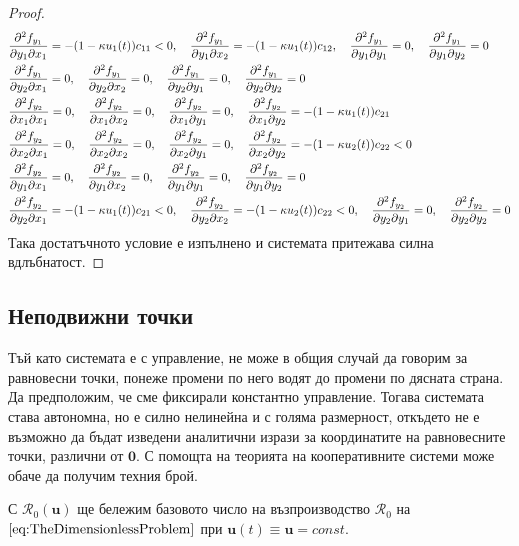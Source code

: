 \begin{proof}
{\begin{align*}
    &\pdv{f_{y_1}}{y_1}{x_1} = -(1-\kappa u_1(t))c_{11} < 0, \quad
    \pdv{f_{y_1}}{y_1}{x_2} = -(1-\kappa u_1(t))c_{12}, \quad
    \pdv{f_{y_1}}{y_1}{y_1} = 0, \quad
    \pdv{f_{y_1}}{y_1}{y_2} = 0 \\
    &\pdv{f_{y_1}}{y_2}{x_1} = 0, \quad
    \pdv{f_{y_1}}{y_2}{x_2} = 0, \quad
    \pdv{f_{y_1}}{y_2}{y_1} = 0, \quad
    \pdv{f_{y_1}}{y_2}{y_2} = 0 \\
    &\pdv{f_{y_2}}{x_1}{x_1} = 0, \quad
    \pdv{f_{y_2}}{x_1}{x_2} = 0, \quad
    \pdv{f_{y_2}}{x_1}{y_1} = 0, \quad
    \pdv{f_{y_2}}{x_1}{y_2} = -(1-\kappa u_1(t)) c_{21} \\
    &\pdv{f_{y_2}}{x_2}{x_1} = 0, \quad
    \pdv{f_{y_2}}{x_2}{x_2} = 0, \quad
    \pdv{f_{y_2}}{x_2}{y_1} = 0, \quad
    \pdv{f_{y_2}}{x_2}{y_2} = -(1-\kappa u_2(t)) c_{22} < 0 \\
    &\pdv{f_{y_2}}{y_1}{x_1} = 0, \quad
    \pdv{f_{y_2}}{y_1}{x_2} = 0, \quad
    \pdv{f_{y_2}}{y_1}{y_1} = 0, \quad
    \pdv{f_{y_2}}{y_1}{y_2} = 0 \\
    &\pdv{f_{y_2}}{y_2}{x_1} = -(1-\kappa u_1(t)) c_{21} < 0, \quad
    \pdv{f_{y_2}}{y_2}{x_2} = -(1-\kappa u_2(t)) c_{22} < 0, \quad
    \pdv{f_{y_2}}{y_2}{y_1} = 0, \quad
    \pdv{f_{y_2}}{y_2}{y_2} = 0
  \end{align*}
}
Така достатъчното условие е изпълнено и системата притежава силна вдлъбнатост.
\end{proof}


\subsection{Неподвижни точки}

Тъй като системата е с управление, не може в общия случай да говорим за равновесни точки, понеже промени по него водят до промени по дясната страна.
Да предположим, че сме фиксирали константно управление.
Тогава системата става автономна, но е силно нелинейна и с голяма размерност, откъдето не е възможно да бъдат изведени аналитични изрази за координатите на равновесните точки, различни от $\mathbf{0}$.
С помощта на теорията на кооперативните системи може обаче да получим техния брой.

\begin{definition}
  С $\mathscr{R}_0(\mathbf{u})$ ще бележим базовото число на възпроизводство $\mathscr{R}_0$ на $\eqref{eq:TheDimensionlessProblem}$ при $\mathbf{u}(t)\equiv \mathbf{u}=const$.
\end{definition}

